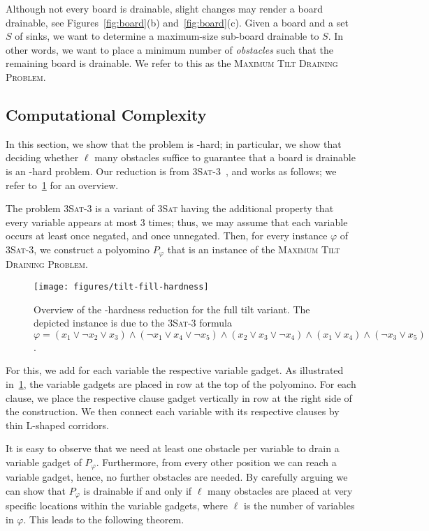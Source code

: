 \documentclass[a4paper,UKenglish,cleveref,thm-restate]{lipics-v2021}
\newcommand{\drainingProb}{\textsc{Maximum Tilt Draining Problem}}
\begin{document}
Although not every board is drainable, slight changes may render a board drainable, see Figures~\ref{fig:board}(b) and~\ref{fig:board}(c). 
Given a board and a set $S$ of sinks, we want to determine a maximum-size sub-board drainable to $S$. 
In other words, we want to place a minimum number of \emph{obstacles}
such that the remaining board is drainable.
We refer to this as the \drainingProb.

\subsection{Computational Complexity}

In this section, we show that the problem is \NP-hard; in particular, we show that deciding whether $\ell$ many obstacles suffice to guarantee that a board is drainable is an \NP-hard problem.
Our reduction is from \textsc{3Sat-3}~\cite{tovey1984simplified}, and works as follows; we refer to~\cref{fig:hardness-example} for an overview.

The problem \textsc{3Sat-3} is a variant of \textsc{3Sat} having the additional property that every variable appears at most $3$ times; thus, we may assume that each variable occurs at least once negated, and once unnegated.
Then, for every instance $\varphi$ of \textsc{3Sat-3}, we construct a polyomino $P_{\varphi}$ that is an instance of the \drainingProb.

\begin{figure}[htb]
	\centering
	\texttt{[image: figures/tilt-fill-hardness]}
	\caption{Overview of the \NP-hardness reduction for the full tilt variant. 
		The depicted instance is due to the \textsc{3Sat-3} formula $\varphi = (x_1 \lor \neg x_2 \lor x_3) \land (\neg x_1 \lor x_4 \lor \neg x_5) \land (x_2 \lor x_3 \lor \neg x_4) \land (x_1 \lor x_4) \land (\neg x_3 \lor x_5)$.
	}
	\label{fig:hardness-example}
\end{figure}

For this, we add for each variable the respective variable gadget. 
As illustrated in~\cref{fig:hardness-example}, the variable gadgets are placed in row at the top of the polyomino. 
For each clause, we place the respective clause gadget vertically in row at the right side of the construction. 
We then connect each variable with its respective clauses by thin L-shaped corridors.

It is easy to observe that we need at least one obstacle per variable to drain a variable gadget of $P_\varphi$.
Furthermore, from every other position we can reach a variable gadget, hence, no further obstacles are needed.
By carefully arguing we can show that $P_{\varphi}$ is drainable if and only if $\ell$ many obstacles are placed at very specific locations within the variable gadgets, where $\ell$ is the number of variables in $\varphi$.
This leads to the following theorem.
\end{document}
